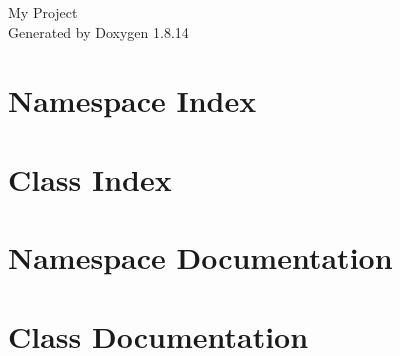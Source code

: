 \documentclass[twoside]{book}
\newcommand{\+}{\discretionary{\mbox{\scriptsize$\hookleftarrow$}}{}{}}
\newcommand{\clearemptydoublepage}{%
  \newpage{\pagestyle{empty}\cleardoublepage}%
}
\begin{document}
\hypersetup{pageanchor=false,
             bookmarksnumbered=true,
             pdfencoding=unicode
            }
\begin{titlepage}
\vspace*{7cm}
\begin{center}%
{\Large My Project }\\
\vspace*{1cm}
{\large Generated by Doxygen 1.8.14}\\
\end{center}
\end{titlepage}
\clearemptydoublepage
{}
\tableofcontents
\clearemptydoublepage
{}
\hypersetup{pageanchor=true}

\chapter{Namespace Index}

\chapter{Class Index}

\chapter{Namespace Documentation}

\chapter{Class Documentation}


\backmatter
\newpage
{}
\clearemptydoublepage
{}
\printindex
\end{document}
